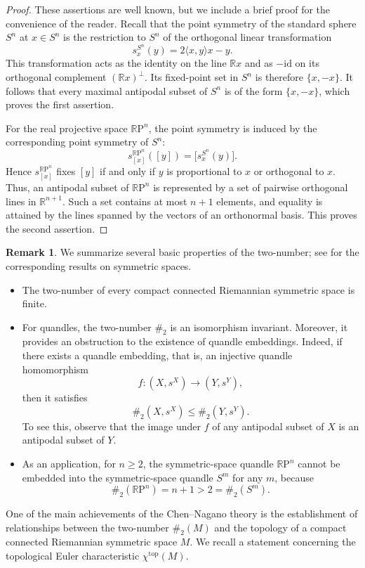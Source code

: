 \documentclass[12pt]{amsart}
\theoremstyle{definition}
\newtheorem{Rem}[Prop]{Remark}
\newcommand{\R}{{\mathbb R}}
\newcommand{\RP}{\R \mathrm{P}}
\newcommand{\id}{\mathrm{id}}
\begin{document}
\begin{proof}
These assertions are well known, 
but we include a brief proof for the convenience of the reader. 
Recall that the point symmetry of the standard sphere $S^n$ at $x\in S^n$ 
is the restriction to $S^n$ of the orthogonal linear transformation 
\[
s_x^{S^n}(y)
=
2\langle x,y\rangle x-y.
\]
This transformation acts as the identity on the line $\R x$ 
and as $-\id$ on its orthogonal complement $(\R x)^\perp$. 
Its fixed-point set in $S^n$ is therefore $\{x,-x\}$. 
It follows that every maximal antipodal subset of $S^n$ is of the form $\{x,-x\}$, 
which proves the first assertion. 

For the real projective space $\RP^n$,
the point symmetry is induced by the corresponding point symmetry of $S^n$:
\[
s_{[x]}^{\RP^n}([y])
=
\bigl[s_x^{S^n}(y)\bigr].
\]
Hence $s_{[x]}^{\RP^n}$ fixes $[y]$ if and only if
$y$ is proportional to $x$ or orthogonal to $x$.
Thus, an antipodal subset of $\RP^n$ is represented by a set of pairwise orthogonal lines in $\R^{n+1}$.
Such a set contains at most $n+1$ elements,
and equality is attained by the lines spanned by the vectors of an orthonormal basis.
This proves the second assertion.
\end{proof}

\begin{Rem}
We summarize several basic properties of the two-number;
see \cite{CN} for the corresponding results on symmetric spaces.
\begin{itemize} 
\item 
The two-number of every compact connected Riemannian symmetric space is finite. 
\item 
For quandles, 
the two-number $\#_2$ is an isomorphism invariant. 
Moreover,
it provides an obstruction to the existence of quandle embeddings. 
Indeed, 
if there exists a quandle embedding, that is, an injective quandle homomorphism 
\[
f \colon (X,s^X)\longrightarrow (Y,s^Y),
\]
then it satisfies 
\[
\#_2(X,s^X)\leq \#_2(Y,s^Y).
\]
To see this,
observe that the image under $f$ of any antipodal subset of $X$ is an antipodal subset of $Y$. 
\item 
As an application,
for $n\geq 2$,
the symmetric-space quandle $\RP^n$ cannot be embedded into
the symmetric-space quandle $S^m$ for any $m$,
because
\[
\#_2(\RP^n)=n+1>2=\#_2(S^m).
\]
\end{itemize} 
\end{Rem}

One of the main achievements of the Chen--Nagano theory
is the establishment of relationships between the two-number $\#_2(M)$
and the topology of a compact connected Riemannian symmetric space $M$.
We recall a statement concerning the topological Euler characteristic $\chi^{\mathrm{top}}(M)$. 
\end{document}
